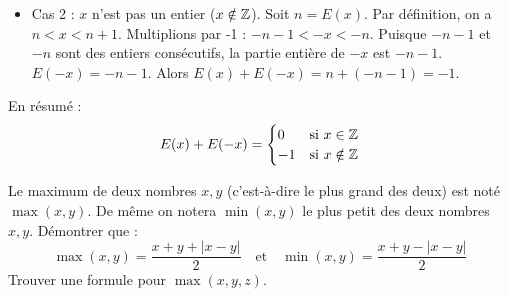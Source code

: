 \documentclass[solutions]{exercices}
\begin{document}
\begin{solution}
\begin{enumerate}
\begin{itemize}
			      \item Cas 2 : $x$ n'est pas un entier ($x \notin \mathbb{Z}$).
			            Soit $n=E(x)$. Par définition, on a $n < x < n+1$.
			            Multiplions par -1 : $-n-1 < -x < -n$.
			            Puisque $-n-1$ et $-n$ sont des entiers consécutifs, la partie entière de $-x$ est $-n-1$.
			            $E(-x) = -n-1$.
			            Alors $E(x)+E(-x) = n + (-n-1) = -1$.
		      \end{itemize}
		      En résumé :
		      \[ E(x)+E(-x) = \begin{cases} 0 & \text{si } x \in \mathbb{Z} \\ -1 & \text{si } x \notin \mathbb{Z} \end{cases} \]
	\end{enumerate}
\end{solution}


\begin{exercice}
	Le maximum de deux nombres $x, y$ (c'est-à-dire le plus grand des deux) est noté $\max(x, y)$. De même on notera $\min(x, y)$ le plus petit des deux nombres $x, y$. Démontrer que :
	\[ \max(x, y) = \frac{x + y + |x - y|}{2} \quad \text{et} \quad \min(x, y) = \frac{x + y - |x - y|}{2} \]
	Trouver une formule pour $\max(x, y, z)$.
\end{exercice}
\end{document}
